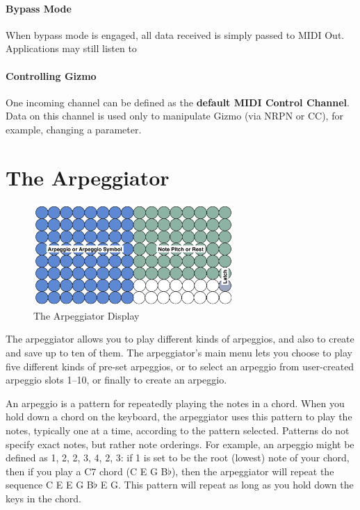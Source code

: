 \documentclass{article}
\begin{document}
\vspace{-0.5em}\paragraph{Bypass Mode} When bypass mode is engaged, all data received is simply passed to MIDI Out.  Applications may still listen to 

\vspace{-0.5em}\paragraph{Controlling Gizmo} One incoming channel can be defined as the {\bf default MIDI Control Channel}.  Data on this channel is used only to manipulate Gizmo (via NRPN or CC), for example, changing a parameter.


\clearpage
\section {The Arpeggiator}

\begin{figure}
\vspace{-1.5em}\includegraphics[width=3in]{arpeggio.pdf}
\vspace{-2em}\caption{\small The Arpeggiator Display}\vspace{-1em}
\label{arpeggiator}
\end{figure}

The arpeggiator allows you to play different kinds of arpeggios, and also to create and save up to ten of them.  The arpeggiator's main menu lets you choose to play five different kinds of pre-set arpeggios, or to select an arpeggio from user-created arpeggio slots 1--10, or finally to create an arpeggio.

An arpeggio is a pattern for repeatedly playing the notes in a chord.  When you hold down a chord on the keyboard, the arpeggiator uses this pattern to play the notes, typically one at a time, according to the pattern selected.  Patterns do not specify exact notes, but rather note orderings.  For example, an arpeggio might be defined as 1, 2, 2, 3, 4, 2, 3: if 1 is set to be the root (lowest) note of your chord, then if you play a C7 chord (C E G B$\flat$), then the arpeggiator will repeat the sequence C E E G B$\flat$ E G.  This pattern will repeat as long as you hold down the keys in the chord.  
\end{document}

